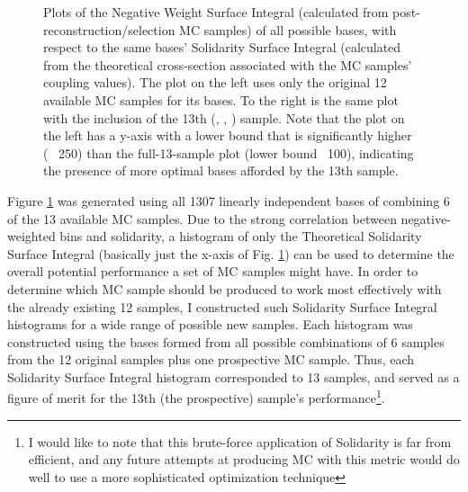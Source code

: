     \begin{figure}[tbh]
        \caption{
            Plots of the Negative Weight Surface Integral (calculated from post-reconstruction/selection MC samples)
                of all possible bases, with respect to the same bases' Solidarity Surface Integral
                (calculated from the theoretical cross-section associated with the MC samples' coupling values).
            The plot on the left uses only the original 12 available MC samples for its bases.
            To the right is the same plot with the inclusion of the 13th (, , ) sample.
            Note that the plot on the left has a y-axis with a lower bound that is significantly higher (~ 250) 
                than the full-13-sample plot (lower bound ~100),
                indicating the presence of more optimal bases afforded by the 13th sample.
        }
        \label{fig:nWeight_solidarity_scatter}
    \end{figure}


    Figure \ref{fig:nWeight_solidarity_scatter} was generated using all 1307 linearly independent bases of combining 6 of the 13 available MC samples.
    Due to the strong correlation between negative-weighted bins and solidarity,
        a histogram of only the Theoretical Solidarity Surface Integral
        (basically just the x-axis of Fig. \ref{fig:nWeight_solidarity_scatter})
        can be used to determine the overall potential performance a set of MC samples might have.
    In order to determine which MC sample should be produced to work most effectively with the already existing 12 samples,
        I constructed such Solidarity Surface Integral histograms for a wide range of possible new samples.
    Each histogram was constructed using the bases formed from all possible combinations of 6 samples from
        the 12 original samples plus one prospective MC sample.
    Thus, each Solidarity Surface Integral histogram corresponded to 13 samples,
        and served as a figure of merit for the 13th (the prospective) sample's performance\footnote{
    I would like to note that this brute-force application of Solidarity is far from efficient,
        and any future attempts at producing MC with this metric
        would do well to use a more sophisticated optimization technique}.

